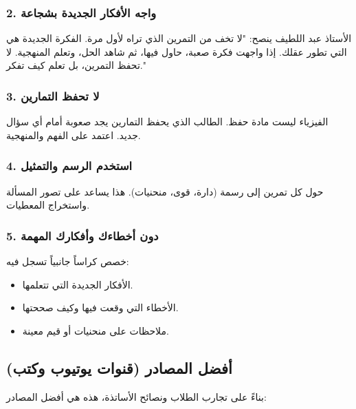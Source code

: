 \documentclass[12pt,a4paper]{book}
\begin{document}
	\subsubsection*{2. واجه الأفكار الجديدة بشجاعة}
	الأستاذ عبد اللطيف ينصح: "لا تخف من التمرين الذي تراه لأول مرة. الفكرة الجديدة هي التي تطور عقلك. إذا واجهت فكرة صعبة، حاول فيها، ثم شاهد الحل، وتعلم المنهجية. لا تحفظ التمرين، بل تعلم كيف تفكر."
	
	\subsubsection*{3. لا تحفظ التمارين}
	الفيزياء ليست مادة حفظ. الطالب الذي يحفظ التمارين يجد صعوبة أمام أي سؤال جديد. اعتمد على الفهم والمنهجية.
	
	\subsubsection*{4. استخدم الرسم والتمثيل}
	حول كل تمرين إلى رسمة (دارة، قوى، منحنيات). هذا يساعد على تصور المسألة واستخراج المعطيات.
	
	\subsubsection*{5. دون أخطاءك وأفكارك المهمة}
	خصص كراساً جانبياً تسجل فيه:
	\begin{itemize}
		\item الأفكار الجديدة التي تتعلمها.
		\item الأخطاء التي وقعت فيها وكيف صححتها.
		\item ملاحظات على منحنيات أو قيم معينة.
	\end{itemize}
	
	\subsection{أفضل المصادر (قنوات يوتيوب وكتب)}
	بناءً على تجارب الطلاب ونصائح الأساتذة، هذه هي أفضل المصادر:
	
\end{document}
